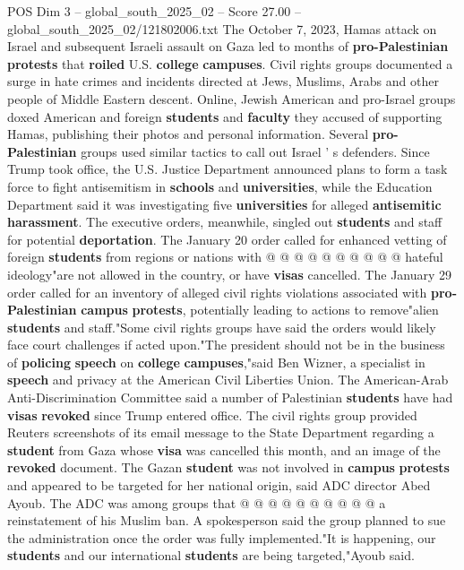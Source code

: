 \begin{textsample}{POS Dim 3 – global\_south\_2025\_02 – Score 27.00 – global\_south\_2025\_02/121802006.txt}
The October 7, 2023, Hamas attack on Israel and subsequent Israeli assault on Gaza led to months of \textbf{pro-Palestinian} \textbf{protests} that \textbf{roiled} U.S. \textbf{college} \textbf{campuses}.
Civil rights groups documented a surge in hate crimes and incidents directed at Jews, Muslims, Arabs and other people of Middle Eastern descent.
Online, Jewish American and pro-Israel groups doxed American and foreign \textbf{students} and \textbf{faculty} they accused of supporting Hamas, publishing their photos and personal information.
Several \textbf{pro-Palestinian} groups used similar tactics to call out Israel ' s defenders.
Since Trump took office, the U.S.
Justice Department announced plans to form a task force to fight antisemitism in \textbf{schools} and \textbf{universities}, while the Education Department said it was investigating five \textbf{universities} for alleged \textbf{antisemitic} \textbf{harassment}.
The executive orders, meanwhile, singled out \textbf{students} and staff for potential \textbf{deportation}.
The January 20 order called for enhanced vetting of foreign \textbf{students} from regions or nations with @ @ @ @ @ @ @ @ @ @ hateful ideology"are not allowed in the country, or have \textbf{visas} cancelled.
The January 29 order called for an inventory of alleged civil rights violations associated with \textbf{pro-Palestinian} \textbf{campus} \textbf{protests}, potentially leading to actions to remove"alien \textbf{students} and staff."Some civil rights groups have said the orders would likely face court challenges if acted upon."The president should not be in the business of \textbf{policing} \textbf{speech} on \textbf{college} \textbf{campuses},"said Ben Wizner, a specialist in \textbf{speech} and privacy at the American Civil Liberties Union.
The American-Arab Anti-Discrimination Committee said a number of Palestinian \textbf{students} have had \textbf{visas} \textbf{revoked} since Trump entered office.
The civil rights group provided Reuters screenshots of its email message to the State Department regarding a \textbf{student} from Gaza whose \textbf{visa} was cancelled this month, and an image of the \textbf{revoked} document.
The Gazan \textbf{student} was not involved in \textbf{campus} \textbf{protests} and appeared to be targeted for her national origin, said ADC director Abed Ayoub.
The ADC was among groups that @ @ @ @ @ @ @ @ @ @ a reinstatement of his Muslim ban.
A spokesperson said the group planned to sue the administration once the order was fully implemented."It is happening, our \textbf{students} and our international \textbf{students} are being targeted,"Ayoub said.

\end{textsample}
